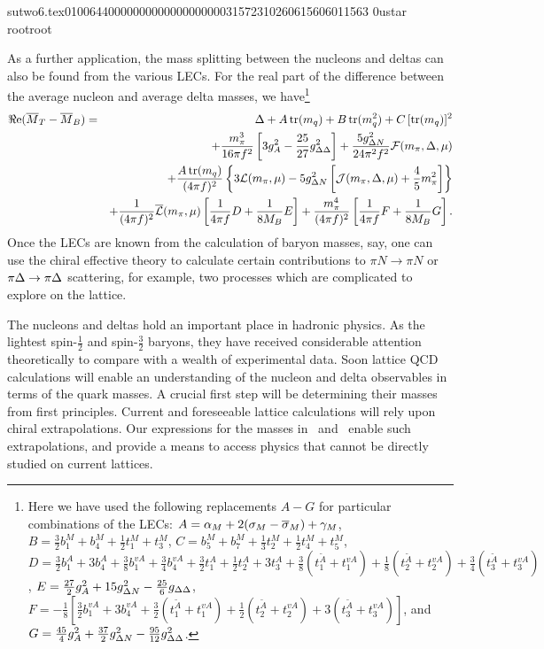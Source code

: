                                                                                                                                                                                                                                                                                       sutwo6.tex                                                                                          0100644 0000000 0000000 00000315723 10260615606 011563  0                                                                                                    ustar   root                            root                                                                                                                                                                                                                   \documentclass[prd,amssymb,amsmath,showpacs,nofootinbib,superscriptaddress]{revtex4}
\begin{document}
As a further application, the mass splitting between the nucleons and
deltas can also be found from the various LECs.  
For the real part of the difference between the average nucleon and average delta masses, we have\footnote{%
Here we have used the following replacements $A-G$ for particular combinations of the LECs: 
$A = {\alpha}_M + 2 (\sigma_M - {\overline{\sigma}}_M ) + \gamma_M$,
$B = \frac{3}{2} b_1^M + b_4^M + \frac{1}{2} t_1^M + t_3^M$,
$C = b_5^M + b_7^M + \frac{1}{3} t_2^M + \frac{1}{2} t_4^M + t_5^M$, 
$D = \frac{3}{2} b_1^A + 3 b_4^A + \frac{3}{8} b_1^{vA} + \frac{3}{4} b_4^{vA} + \frac{3}{2} t_1^A + \frac{1}{2} t_2^A + 3 t_3^A 
+ \frac{3}{8} (t_1^{\tilde{A}} + t_1^{vA}) + \frac{1}{8} (t_2^{\tilde{A}} + t_2^{vA}) + \frac{3}{4} (t_3^{\tilde{A}} + t_3^{vA})
$,
$E = \frac{27}{2} g_A^2 +  15 g_{{\Delta} N}^2 - \frac{25}{6} g_{{\Delta} {\Delta}}$, 
$F = - \frac{1}{8} \left[ \frac{3}{2} b_1^{vA} + 3 b_4^{vA} 
+ \frac{3}{2} (t_1^{\tilde{A}} + t_1^{vA}) + \frac{1}{2} (t_2^{\tilde{A}} + t_2^{vA}) + 3 (t_3^{\tilde{A}} + t_3^{vA})\right]
$, and
$G = \frac{45}{4} g_A^2 + \frac{37}{2} g_{{\Delta} N}^2 - \frac{95}{12} g_{{\Delta} {\Delta}}^2$.
}
\begin{eqnarray}
\Re \text{e} ({\overline{M}}_T - {\overline{M}}_B) 
&=& 
\Delta 
+ 
A \, \text{tr} (m_q) 
+ 
B \, \text{tr} (m_q^2) 
+ 
C \, [\text{tr}(m_q)]^2 
\notag \\  
&& 
+ \frac{m_\pi^3}{16 \pi f^2} \left[ 3 g_A^2 - \frac{25}{27} g_{{\Delta} {\Delta}}^2 \right] 
+ \frac{5 g_{{\Delta} N}^2}{24 \pi^2 f^2} {\mathcal F}(m_\pi, {\Delta}, \mu) \notag \\
&& 
+
\frac{A \, \text{tr}(m_q)}{(4 \pi f)^2} 
\left\{
3  {\mathcal L} (m_\pi, \mu) 
- 
5 g_{{\Delta} N}^2  
\left[ 
{\mathcal J} (m_\pi, {\Delta}, \mu) 
+ 
\frac{4}{5} m_\pi^2 
\right]
\right\}
\notag \\
&& +
\frac{1}{(4 \pi f)^2} {\overline{{\mathcal L}}}(m_\pi,\mu) 
\left[ 
\frac{1}{4 \pi f} D + \frac{1}{8 M_B} E
\right]
+ 
\frac{m_\pi^4}{(4 \pi f)^2}
\left[ 
\frac{1}{4 \pi f} F + \frac{1}{8 M_B} G
\right]. \notag \\
\end{eqnarray}
Once the LECs are known from the calculation of baryon masses, say,
one can use the chiral effective theory to calculate certain
contributions to $\pi N \to \pi N$ or $\pi {\Delta} \to \pi {\Delta}$ scattering,
for example, two processes which are complicated to explore
on the lattice.

The nucleons and deltas hold an important place in hadronic
physics. As the lightest spin-$\frac{1}{2}$ and spin-$\frac{3}{2}$
baryons, they have received considerable attention theoretically to
compare with a wealth of experimental data.  Soon lattice QCD
calculations will enable an understanding of the nucleon and delta
observables in terms of the quark masses.  A crucial first
step will be determining their masses from first principles. Current
and foreseeable lattice calculations will rely upon chiral
extrapolations.  Our expressions for the masses in \CPT\ and \PQCPT\
enable such extrapolations, and provide a means to access physics that
cannot be directly studied on current lattices.
\end{document}
